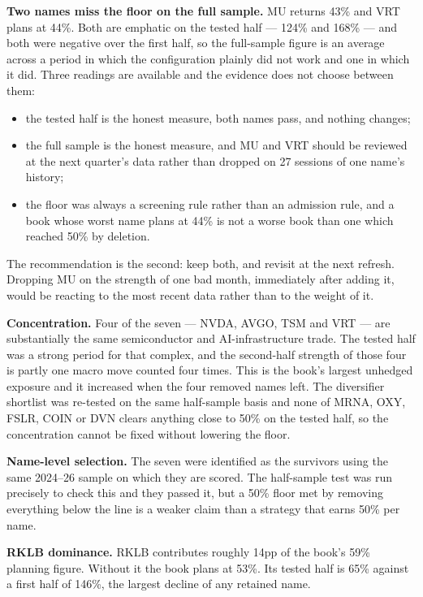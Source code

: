 \documentclass[11pt]{article}
\begin{document}
\textbf{Two names miss the floor on the full sample.} MU returns 43\% and VRT plans at 44\%. Both
are emphatic on the tested half --- 124\% and 168\% --- and both were negative over the first
half, so the full-sample figure is an average across a period in which the configuration plainly
did not work and one in which it did. Three readings are available and the evidence does not
choose between them:
\begin{itemize}[leftmargin=1.4em,topsep=0.2em]
\item the tested half is the honest measure, both names pass, and nothing changes;
\item the full sample is the honest measure, and MU and VRT should be reviewed at the next
      quarter's data rather than dropped on 27 sessions of one name's history;
\item the floor was always a screening rule rather than an admission rule, and a book whose worst
      name plans at 44\% is not a worse book than one which reached 50\% by deletion.
\end{itemize}
The recommendation is the second: keep both, and revisit at the next refresh. Dropping MU on the
strength of one bad month, immediately after adding it, would be reacting to the most recent data
rather than to the weight of it.

\textbf{Concentration.} Four of the seven --- NVDA, AVGO, TSM and VRT --- are substantially the
same semiconductor and AI-infrastructure trade. The tested half was a strong period for that
complex, and the second-half strength of those four is partly one macro move counted four times.
This is the book's largest unhedged exposure and it increased when the four removed names left.
The diversifier shortlist was re-tested on the same half-sample basis and none of MRNA, OXY, FSLR,
COIN or DVN clears anything close to 50\% on the tested half, so the concentration cannot be fixed
without lowering the floor.

\textbf{Name-level selection.} The seven were identified as the survivors using the same 2024--26
sample on which they are scored. The half-sample test was run precisely to check this and they
passed it, but a 50\% floor met by removing everything below the line is a weaker claim than a
strategy that earns 50\% per name.

\textbf{RKLB dominance.} RKLB contributes roughly 14pp of the book's 59\% planning figure. Without
it the book plans at 53\%. Its tested half is 65\% against a first half of 146\%, the largest
decline of any retained name.
\end{document}
